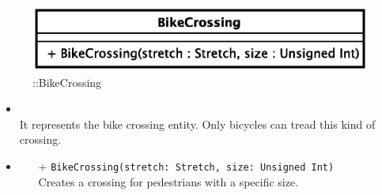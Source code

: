 \begin{figure}[h]
\centering
\includegraphics[scale=0.6,keepaspectratio]{images/solution/bike_crossing.eps}
\caption{\pReactiveComponentStretchDecoration::BikeCrossing}
\label{fig:sd-app-bike_crossing}
\end{figure}
\FloatBarrier
\begin{itemize}
  \item \textbf{\descr} \\
    It represents the bike crossing entity. Only bicycles can tread this kind 
of crossing.
\item \textbf{\ops}
  \begin{itemize}
    \item[+] \texttt{BikeCrossing(stretch: Stretch, size: Unsigned Int)} \\
Creates a crossing for pedestrians with a specific size.
  	\end{itemize}
\end{itemize}
